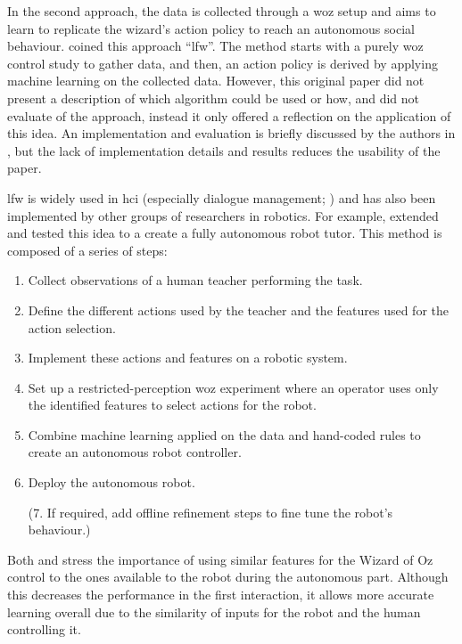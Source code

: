     In the second approach, the data is collected through a \gls{woz} setup and aims to learn to replicate the wizard's action policy to reach an autonomous social behaviour. \cite{knox2014learning} coined this approach ``\gls{lfw}''. The method starts with a purely \gls{woz} control study to gather data, and then, an action policy is derived by applying machine learning on the collected data. However, this original paper did not present a description of which algorithm could be used or how, and did not evaluate of the approach, instead it only offered a reflection on the application of this idea. An implementation and evaluation is briefly discussed by the authors in \cite{knox2016learning}, but the lack of implementation details and results reduces the usability of the paper.
    
    \gls{lfw} is widely used in \gls{hci} (especially dialogue management; \citealt{rieser2008learning}) and has also been implemented by other groups of researchers in robotics. For example, \citet{sequeira2016discovering} extended and tested this idea to a create a fully autonomous robot tutor. This method is composed of a series of steps: 
    \begin{enumerate}
    	\item Collect observations of a human teacher performing the task.
    	\item Define the different actions used by the teacher and the features used for the action selection.
    	\item Implement these actions and features on a robotic system.
    	\item Set up a restricted-perception \gls{woz} experiment where an operator uses only the identified features to select actions for the robot.
    	\item Combine machine learning applied on the data and hand-coded rules to create an autonomous robot controller.
    	\item Deploy the autonomous robot.
    	\item[(7.] If required, add offline refinement steps to fine tune the robot's behaviour.)
    \end{enumerate}

    Both \citet{knox2014learning} and \citet{sequeira2016discovering} stress the importance of using similar features for the Wizard of Oz control to the ones available to the robot during the autonomous part. Although this decreases the performance in the first interaction, it allows more accurate learning overall due to the similarity of inputs for the robot and the human controlling it.
        
